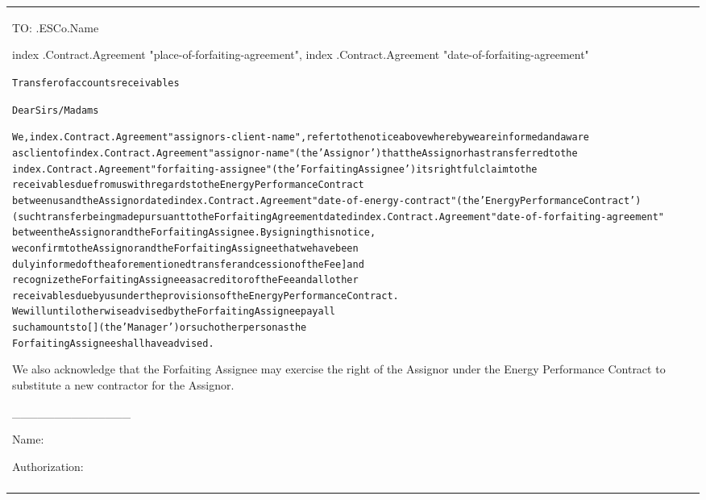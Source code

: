 \documentclass[a4paper]{article}
\begin{document}
\pagebreak

\begin{tabu}{|X|} \tabucline{}

  TO:  {{.ESCo.Name}} \par

  \begin{flushright}
     {{index .Contract.Agreement "place-of-forfaiting-agreement"}},  {{index .Contract.Agreement "date-of-forfaiting-agreement"}} \par
  \end{flushright}

\begin{alltt}

 Transfer of accounts receivables



Dear Sirs/Madams



We,  {{index .Contract.Agreement "assignors-client-name"}}, refer to the notice above whereby we are informed and aware
 as client of  {{index .Contract.Agreement "assignor-name"}}(the 'Assignor') that the Assignor has transferred to the
 {{index .Contract.Agreement "forfaiting-assignee"}} (the 'Forfaiting Assignee') its rightful claim to the
 receivables due from us with regards to the Energy Performance Contract
between us and the Assignor dated  {{index .Contract.Agreement "date-of-energy-contract"}} (the 'Energy Performance Contract')
(such transfer being made pursuant to the Forfaiting Agreement dated  {{index .Contract.Agreement "date-of-forfaiting-agreement"}}
between the Assignor and the Forfaiting Assignee. By signing this notice,
we confirm to the Assignor and the Forfaiting Assignee that we have been
duly informed of the aforementioned transfer and cession of the Fee] and
recognize the Forfaiting Assignee as a creditor of the Fee and all other
 receivables due by us under the provisions of the Energy Performance Contract.
 We will until otherwise advised by the Forfaiting Assignee pay all
such amounts to [ ] (the 'Manager') or such other person as the
Forfaiting Assignee shall have advised.
\end{alltt}

  \vspace{2mm}

  We also acknowledge that the Forfaiting Assignee may exercise the
  right of the Assignor under the Energy Performance Contract to
  substitute a new contractor for the Assignor.

  \vspace{2cm}

  \begin{flushright}
    {\_\_\_\_\_\_\_\_\_\_\_\_\_\_} \par
    Name: \par
    Authorization: \par
  \end{flushright}

  \vspace{1cm} \\\tabucline{}

\end{tabu}
\end{document}
